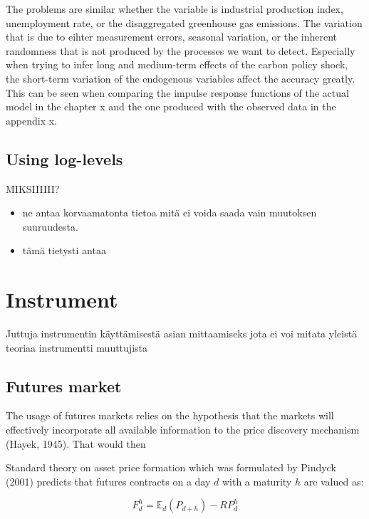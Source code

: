 \documentclass[
  12pt,
  a4paper,
]{report}
\begin{document}
The problems are similar whether the variable is industrial production index, unemployment rate, or the disaggregated greenhouse gas emissions. The variation that is due to eihter measurement errors, seasonal variation, or the inherent randomness that is not produced by the processes we want to detect. Especially when trying to infer long and medium-term effects of the carbon policy shock, the short-term variation of the endogenous variables affect the accuracy greatly. This can be seen when comparing the impulse response functions of the actual model in the chapter x and the one produced with the observed data in the appendix x.

\hypertarget{using-log-levels}{%
\section{Using log-levels}\label{using-log-levels}}

MIKSIIIIII?

\begin{itemize}
\item
  ne antaa korvaamatonta tietoa mitä ei voida saada vain muutoksen suuruudesta.
\item
  tämä tietysti antaa
\end{itemize}

\newpage

\hypertarget{instrument}{%
\chapter{Instrument}\label{instrument}}

Juttuja instrumentin käyttämisestä asian mittaamiseks jota ei voi mitata yleistä teoriaa instrumentti muuttujista

\hypertarget{futures-market}{%
\section{Futures market}\label{futures-market}}

The usage of futures markets relies on the hypothesis that the markets will effectively incorporate all available information to the price discovery mechanism (Hayek, 1945). That would then

Standard theory on asset price formation which was formulated by Pindyck (2001) predicts that futures contracts on a day \(d\) with a maturity \(h\) are valued as:

\[
  F_d^h = \mathbb{E}_d(P_{d+h})-RP^h_d
\]
\end{document}
